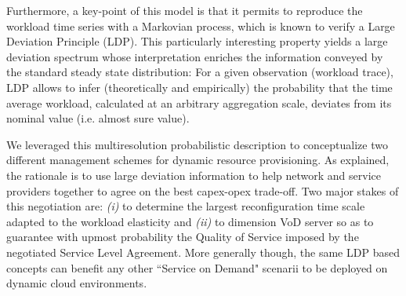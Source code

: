 \documentclass[twoside]{article}
\begin{document}
Furthermore, a key-point of this model is that it permits to reproduce the workload time series with a Markovian process, which is known to verify a Large Deviation Principle (LDP). This particularly interesting property yields a large deviation spectrum whose interpretation enriches the information conveyed by the standard steady state distribution: For a given observation (workload trace), LDP allows to infer (theoretically and empirically) the probability that the time average workload, calculated at an arbitrary aggregation scale, deviates from its nominal value (i.e. almost sure value). 

We leveraged this multiresolution probabilistic description to conceptualize two different management schemes for dynamic resource provisioning. As explained, the rationale is to use large deviation information to help network and service providers together to agree on the best {\sc capex}-{\sc opex} trade-off. Two major stakes of this negotiation are: {\it (i)} to determine the largest reconfiguration time scale adapted to the workload elasticity and {\it (ii)} to dimension VoD server so as to guarantee with upmost probability the Quality of Service imposed by the negotiated  Service Level Agreement.
\newline
More generally though, the same LDP based concepts can benefit any other ``Service on Demand" scenarii to be deployed on dynamic cloud environments.  \newpage



\end{document}
